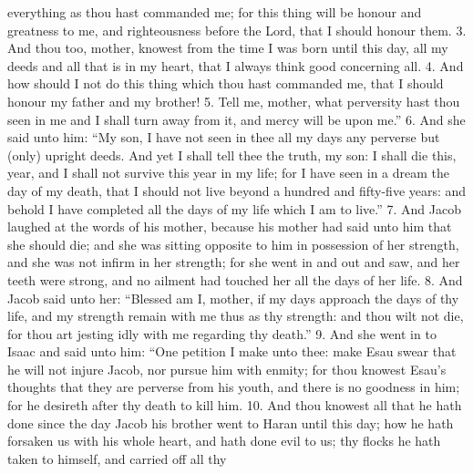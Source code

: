 everything as thou hast commanded me; for this thing will be honour and greatness to me, and righteousness before the Lord, that I should honour them. 3. And thou too, mother, knowest from the time I was born until this day, all my deeds and all that is in my heart, that I always think good concerning all. 4. And how should I not do this thing which thou hast commanded me, that I should honour my father and my brother! 5. Tell me, mother, what perversity hast thou seen in me and I shall turn away from it, and mercy will be upon me.'' 6. And she said unto him: ``My son, I have not seen in thee all my days any perverse but (only) upright deeds. And yet I shall tell thee the truth, my son: I shall die this, year, and I shall not survive this year in my life; for I have seen in a dream the day of my death, that I should not live beyond a hundred and fifty-five years: and behold I have completed all the days of my life which I am to live.'' 7. And Jacob laughed at the words of his mother, because his mother had said unto him that she should die; and she was sitting opposite to him in possession of her strength, and she was not infirm in her strength; for she went in and out and saw, and her teeth were strong, and no ailment had touched her all the days of her life. 8. And Jacob said unto her: ``Blessed am I, mother, if my days approach the days of thy life, and my strength remain with me thus as thy strength: and thou wilt not die, for thou art jesting idly with me regarding thy death.'' 9. And she went in to Isaac and said unto him: ``One petition I make unto thee: make Esau swear that he will not injure Jacob, nor pursue him with enmity; for thou knowest Esau's thoughts that they are perverse from his youth, and there is no goodness in him; for he desireth after thy death to kill him. 10. And thou knowest all that he hath done since the day Jacob his brother went to Haran until this day; how he hath forsaken us with his whole heart, and hath done evil to us; thy flocks he hath taken to himself, and carried off all thy

